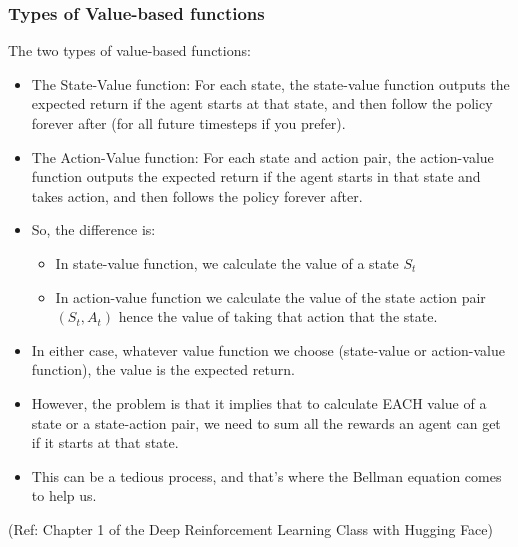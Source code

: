 \begin{frame}[fragile]\frametitle{Types of Value-based functions}

The two types of value-based functions:

\begin{itemize}
\item The State-Value function: For each state, the state-value function outputs the expected return if the agent starts at that state, and then follow the policy forever after (for all future timesteps if you prefer).
\item The Action-Value function: For each state and action pair, the action-value function outputs the expected return if the agent starts in that state and takes action, and then follows the policy forever after.
\item So, the difference is:
	\begin{itemize}
	\item In state-value function, we calculate the value of a state $S_t$
	\item In action-value function we calculate the value of the state action pair $(S_t, A_t)$ hence the value of taking that action that the state.
	\end{itemize}
\item In either case, whatever value function we choose (state-value or action-value function), the value is the expected return.
\item However, the problem is that it implies that to calculate EACH value of a state or a state-action pair, we need to sum all the rewards an agent can get if it starts at that state.
\item This can be a tedious process, and that's where the Bellman equation comes to help us.
\end{itemize}




{\tiny (Ref: Chapter 1 of the Deep Reinforcement Learning Class with Hugging Face)}


\end{frame}

